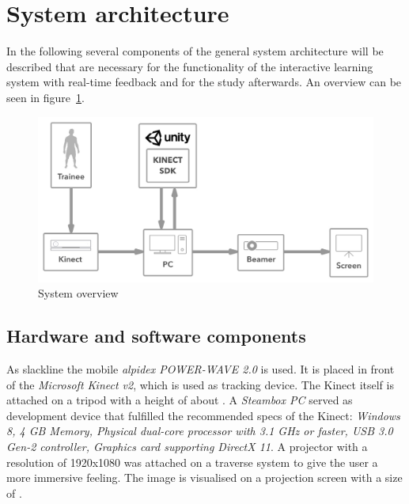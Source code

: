 \section{System architecture}\label{5_3_systemArchitecture}
In the following several components of the general system architecture will be described that are necessary for the functionality of the interactive learning system with real-time feedback and for the study afterwards. An overview can be seen in figure~\ref{fig:5_3_systemArchitecture}.
\begin{figure}[htb]
	\centering
	\begin{minipage}[t]{1\linewidth}
		\centering
		\includegraphics[width=1\linewidth]{Pictures/5_3_systemArchitecture}
		\caption{System overview}
		\label{fig:5_3_systemArchitecture}
	\end{minipage}
\end{figure}

\subsection{Hardware and software components}

As slackline the mobile \textit{alpidex POWER-WAVE 2.0} is used. It is placed in front of the \textit{Microsoft Kinect v2}, which is used as tracking device. The Kinect itself is attached on a  tripod with a height of about . A \textit{Steambox PC}  served as development device that fulfilled the recommended specs of the Kinect: \textit{Windows 8, 4 GB Memory, Physical dual-core processor with 3.1 GHz or faster, USB 3.0 Gen-2 controller, Graphics card supporting DirectX 11}. A projector  with a resolution of 1920x1080 was attached on a traverse system to give the user a more immersive feeling. The image is visualised on a projection screen with a size of .

